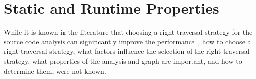 

\section{Static and Runtime Properties}
\label{sec:compute-properties}
While it is known in the literature that choosing a right traversal strategy for
the source code analysis can significantly improve the
performance~\cite{atkinson2001implementation}, how to choose a right traversal
strategy, what factors influence the selection of the right traversal strategy,
what properties of the analysis and graph are important, and how to determine
them, were not known.

